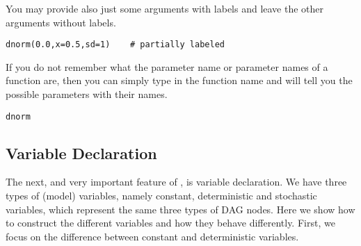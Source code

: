 You may provide also just some arguments with labels and leave the other arguments without labels.
{\tt \begin{snugshade*}
\begin{lstlisting}    
dnorm(0.0,x=0.5,sd=1)    # partially labeled
\end{lstlisting}
\end{snugshade*}}
If you do not remember what the parameter name or parameter names of a function are, then you can simply type in the function name and \RevBayes will tell you the possible parameters with their names.
{\tt \begin{snugshade*}
\begin{lstlisting}    
dnorm
\end{lstlisting}
\end{snugshade*}}

\subsection{Variable Declaration}
The next, and very important feature of \RevBayes, is variable declaration. 
We have three types of (model) variables, namely constant, deterministic and stochastic variables, which represent the same three types of DAG nodes. 
Here we show how to construct the different variables and how they behave differently. 
First, we focus on the difference between constant and deterministic variables.

